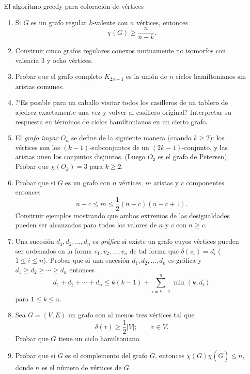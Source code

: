 \begin{section}{El algoritmo greedy para coloración de vértices}
\begin{enumerate}[1)]
\item Si $G$ es un grafo regular $k$-valente con $n$ vértices, entonces
$$
\chi(G)\ge \frac{n}{n-k}.
$$

\item Construir cinco grafos regulares conexos mutuamente no isomorfos
con valencia $3$ y ocho vértices.

\item Probar que el grafo completo $K_{2n+1}$ es la unión de $n$ ciclos
hamiltonianos sin aristas comunes.

\item ?`Es posible para un caballo visitar todos los casilleros de un
tablero de ajedrez exactamente una vez y volver al casillero
original? Interpretar su respuesta en términos de ciclos
hamiltonianos en un cierto grafo.

\item El {\em grafo impar} $O_n$ se define de la siguiente
manera   (cuando $k\ge 2$): los vértices son
los $(k-1)$-subconjuntos de un $(2k-1)$-conjunto, y las aristas
unen los conjuntos disjuntos. (Luego $O_3$ es el grafo de
Petersen). Probar que $\chi(O_k)=3$ para $k\ge 2$.

\item Probar que si $G$ es un grafo con $n$ vértices, $m$ aristas y $c$
componentes entonces
$$
n-c \le m \le \frac12(n-c)(n-c+1).
$$
Construir ejemplos mostrando que ambos extremos de las
desigualdades pueden ser alcanzados para todos los valores de $n$
y $c$ con $n\ge c$.

\item Una sucesión $d_1,d_2,\ldots,d_n$ es {\em gráfica} si existe un
grafo cuyos vértices pueden ser ordenados en la forma
$v_1,v_2,\ldots,v_n$ de tal forma que $\delta(v_i)=d_i$ ($1\le i
\le n$). Probar que si una sucesión $d_1,d_2,\ldots,d_n$ es
gráfica y $d_1 \ge d_2 \ge \cdots \ge d_n$ entonces
$$
d_1 + d_2 + \cdots + d_n \le k(k-1) + \sum_{i=k+1}^n
\operatorname{min}(k,d_i)
$$
para $1 \le k \le n$.

\item Sea $G=(V,E)$ un grafo con al menos tres vértices tal que
$$
\delta(v) \ge \frac12 |V|;\qquad v\in V.
$$
Probar que $G$ tiene un ciclo hamiltoniano.

\item Probar que si $\tilde G$ es el complemento del grafo $G$, entonces
$\chi(G)\chi(\tilde G)\le n$, donde $n$ es el número de vértices
de $G$.
\end{enumerate}
\end{section}

